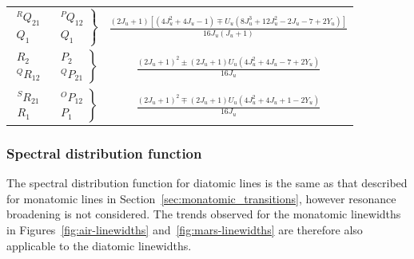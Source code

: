 \begin{table}[h]
\begin{tabular*}{0.7\textwidth}{ccc}
              $\begin{array}{c} ^R Q_{2 1} \\ Q_1 \end{array}$ & $\left . \begin{array}{c} ^P Q_{1 2} \\ Q_1 \end{array} \right \rbrace$   & $\frac{(2 J_u + 1) \left [ ( 4 J_u^2 + 4 J_u - 1 ) \mp U_u ( 8 J_u^3 + 12 J_u ^2 - 2 J_u - 7 + 2 Y_u ) \right ]}{16 J_u ( J_u +1 )}$ \\ 
              $\begin{array}{c} R_2 \\ ^Q R_{1 2} \end{array}$ & $\left . \begin{array}{c} P_2 \\ ^Q P_{2 1} \end{array} \right \rbrace$    & $\frac{(2 J_u + 1)^2 \pm (2 J_u + 1 ) U_u ( 4 J_u^2 + 4 J_u -7 + 2Y_u )}{16 J_u}$ \\
              $\begin{array}{c} ^S R_{2 1} \\ R_1 \end{array}$ & $\left . \begin{array}{c} ^O P_{1 2} \\ P_1 \end{array} \right \rbrace$    & $\frac{(2 J_u + 1)^2 \mp (2 J_u + 1 ) U_u ( 4 J_u^2 + 4 J_u + 1 - 2Y_u )}{16 J_u}$ \\ 
  \hline
 \end{tabular*}
\end{table}

\subsubsection{Spectral distribution function }

The spectral distribution function for diatomic lines is the same as that described for monatomic lines in Section~\ref{sec:monatomic_transitions}, however resonance broadening is not considered.
The trends observed for the monatomic linewidths in Figures~\ref{fig:air-linewidths} and~\ref{fig:mars-linewidths} are therefore also applicable to the diatomic linewidths.

\par

